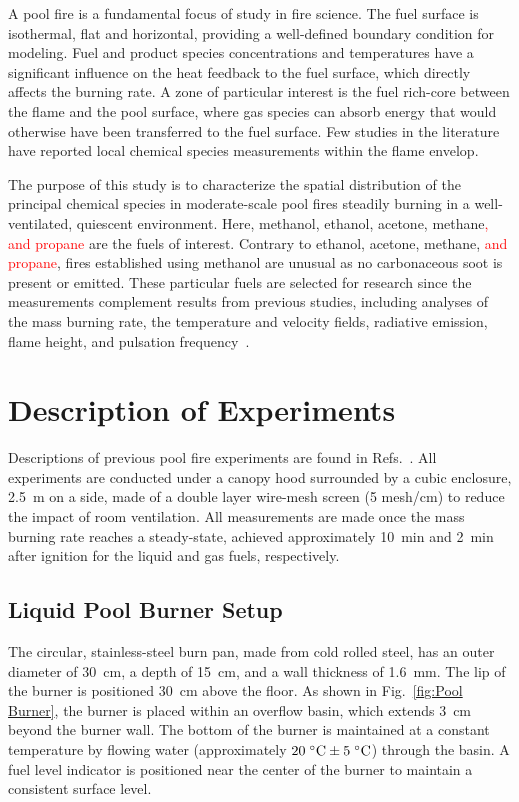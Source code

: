 \documentclass[12pt]{article}
\begin{document}
A pool fire is a fundamental focus of study in fire science. The fuel surface is isothermal, flat and horizontal, providing a well-defined boundary condition for modeling. Fuel and product species concentrations and temperatures have a significant influence on the heat feedback to the fuel surface, which directly affects the burning rate. A zone of particular interest is the fuel rich-core between the flame and the pool surface, where gas species can absorb energy that would otherwise have been transferred to the fuel surface. Few studies in the literature have reported local chemical species measurements within the flame envelop.

The purpose of this study is to characterize the spatial distribution of the principal chemical species in moderate-scale pool fires steadily burning in a well-ventilated, quiescent environment. Here, methanol, ethanol, acetone, methane\textcolor{red}{, and propane} are the fuels of interest. Contrary to ethanol, acetone, methane, \textcolor{red}{and propane}, fires established using methanol are unusual as no carbonaceous soot is present or emitted. These particular fuels are selected for research since the measurements complement results from previous studies, including analyses of the mass burning rate, the temperature and velocity fields, radiative emission, flame height, and pulsation frequency~\cite{Fisher1987,Hamins2016}.


\clearpage

\section{Description of Experiments}
\label{sec:Experiments}

Descriptions of previous pool fire experiments are found in Refs.~\cite{Hamins2016,Hamins1994,Hamins1991,Hamins1996,Lock2008}. All experiments are conducted under a canopy hood surrounded by a cubic enclosure, 2.5~m on a side, made of a double layer wire-mesh screen (5 mesh/cm) to reduce the impact of room ventilation. All measurements are made once the mass burning rate reaches a steady-state, achieved approximately 10~min and 2~min after ignition for the liquid and gas fuels, respectively.

\subsection{Liquid Pool Burner Setup}
\label{ssec:Liquid_Pool_Burner_Setup}

The circular, stainless-steel burn pan, made from cold rolled steel, has an outer diameter of 30~cm, a depth of 15~cm, and a wall thickness of 1.6~mm. The lip of the burner is positioned 30~cm above the floor. As shown in Fig.~\ref{fig:Pool Burner}, the burner is placed within an overflow basin, which extends 3~cm beyond the burner wall.  The bottom of the burner is maintained at a constant temperature by flowing water (approximately $20 \; ^\circ \hbox{C} \pm 5 \; ^\circ \hbox{C}$) through the basin. A fuel level indicator is positioned near the center of the burner to maintain a consistent surface level.
\end{document}
